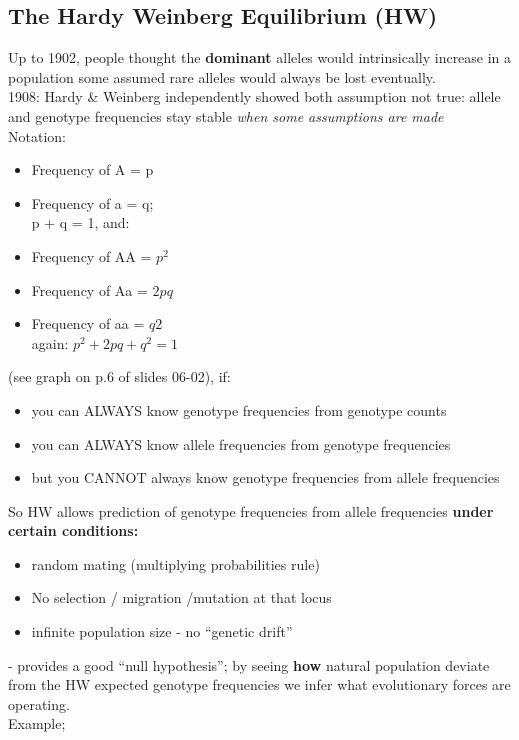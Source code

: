 \documentclass{scrartcl}
\begin{document}
\subsection{The Hardy Weinberg Equilibrium (HW)}
\label{sec:06-2}
Up to 1902, people thought the {\bf dominant} alleles would intrinsically increase in a population some assumed rare alleles would always be lost eventually.\\
1908: Hardy \& Weinberg independently showed both assumption not true: allele and genotype frequencies stay stable {\em when some assumptions are made}\\
Notation:
\begin{itemize}
\item Frequency of A = p
\item Frequency of a = q; \\
  p + q = 1, and:
\item Frequency of AA = $p^2$
\item Frequency of Aa = $2pq$
\item Frequency of aa = $q2$\\
  again: $p^2 + 2pq + q^2 = 1$
\end{itemize}
(see graph on p.6 of slides 06-02), if:
\begin{itemize}
\item you can ALWAYS know genotype frequencies from genotype counts
\item you can ALWAYS know allele frequencies from genotype frequencies
\item but you CANNOT always know genotype frequencies from allele frequencies
\end{itemize}
So HW allows prediction of genotype frequencies from allele frequencies {\bf under certain conditions: }
\begin{itemize}
\item random mating (multiplying probabilities rule)
\item No selection / migration /mutation at that locus
\item infinite population size - no ``genetic drift''
\end{itemize}
- provides a good ``null hypothesis''; by seeing {\bf how } natural population deviate from the HW expected genotype frequencies we infer what evolutionary forces are operating.\\
Example;
\end{document}
